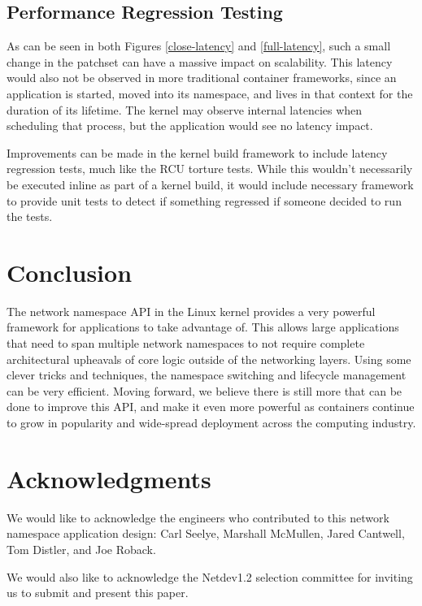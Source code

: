 \documentclass[letterpaper]{article}
\begin{document}
\subsection{Performance Regression Testing}
As can be seen in both Figures \ref{close-latency} and \ref{full-latency}, such a small change in the patchset \cite{biederman2014} can have a massive impact on scalability. This latency would also not be observed in more traditional container frameworks, since an application is started, moved into its namespace, and lives in that context for the duration of its lifetime. The kernel may observe internal latencies when scheduling that process, but the application would see no latency impact.

Improvements can be made in the kernel build framework to include latency regression tests, much like the RCU torture tests. While this wouldn't necessarily be executed inline as part of a kernel build, it would include necessary framework to provide unit tests to detect if something regressed if someone decided to run the tests.

\section{Conclusion}
The network namespace API in the Linux kernel provides a very powerful framework for applications to take advantage of. This allows large applications that need to span multiple network namespaces to not require complete architectural upheavals of core logic outside of the networking layers. Using some clever tricks and techniques, the namespace switching and lifecycle management can be very efficient. Moving forward, we believe there is still more that can be done to improve this API, and make it even more powerful as containers continue to grow in popularity and wide-spread deployment across the computing industry.

\section{Acknowledgments}
We would like to acknowledge the engineers who contributed to this network namespace application design: Carl Seelye, Marshall McMullen, Jared Cantwell, Tom Distler, and Joe Roback.

We would also like to acknowledge the Netdev1.2 selection committee for inviting us to submit and present this paper.



\end{document}

